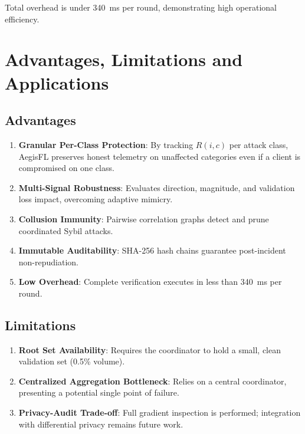 \documentclass[12pt,a4paper]{report}
\begin{document}
Total overhead is under 340~ms per round, demonstrating high operational efficiency.

\newpage
\chapter{Advantages, Limitations and Applications}

\section{Advantages}
\begin{enumerate}
    \item \textbf{Granular Per-Class Protection}: By tracking $R(i, c)$ per attack class, AegisFL preserves honest telemetry on unaffected categories even if a client is compromised on one class.
    \item \textbf{Multi-Signal Robustness}: Evaluates direction, magnitude, and validation loss impact, overcoming adaptive mimicry.
    \item \textbf{Collusion Immunity}: Pairwise correlation graphs detect and prune coordinated Sybil attacks.
    \item \textbf{Immutable Auditability}: SHA-256 hash chains guarantee post-incident non-repudiation.
    \item \textbf{Low Overhead}: Complete verification executes in less than 340~ms per round.
\end{enumerate}

\section{Limitations}
\begin{enumerate}
    \item \textbf{Root Set Availability}: Requires the coordinator to hold a small, clean validation set (0.5\% volume).
    \item \textbf{Centralized Aggregation Bottleneck}: Relies on a central coordinator, presenting a potential single point of failure.
    \item \textbf{Privacy-Audit Trade-off}: Full gradient inspection is performed; integration with differential privacy remains future work.
\end{enumerate}
\end{document}
